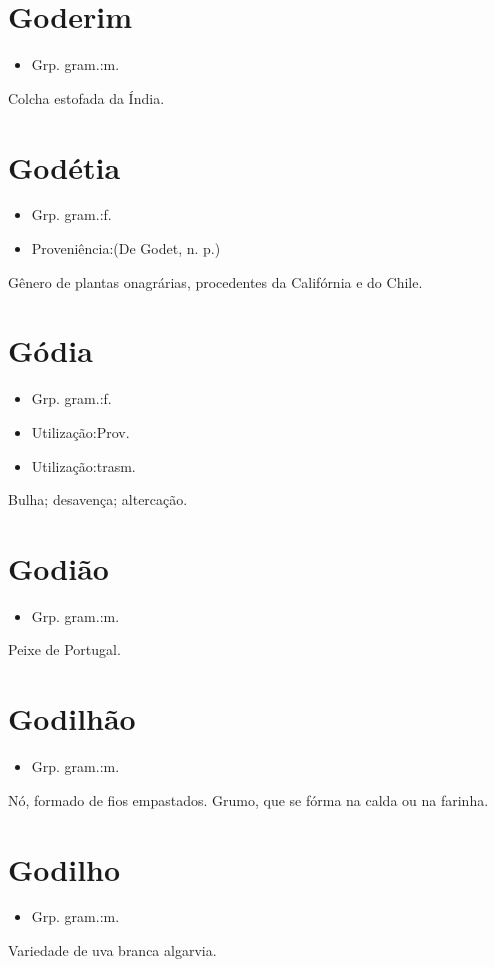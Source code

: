 \section{Goderim}
\begin{itemize}
\item {Grp. gram.:m.}
\end{itemize}
Colcha estofada da Índia.
\section{Godétia}
\begin{itemize}
\item {Grp. gram.:f.}
\end{itemize}
\begin{itemize}
\item {Proveniência:(De \textunderscore Godet\textunderscore , n. p.)}
\end{itemize}
Gênero de plantas onagrárias, procedentes da Califórnia e do Chile.
\section{Gódia}
\begin{itemize}
\item {Grp. gram.:f.}
\end{itemize}
\begin{itemize}
\item {Utilização:Prov.}
\end{itemize}
\begin{itemize}
\item {Utilização:trasm.}
\end{itemize}
Bulha; desavença; altercação.
\section{Godião}
\begin{itemize}
\item {Grp. gram.:m.}
\end{itemize}
Peixe de Portugal.
\section{Godilhão}
\begin{itemize}
\item {Grp. gram.:m.}
\end{itemize}
Nó, formado de fios empastados.
Grumo, que se fórma na calda ou na farinha.
\section{Godilho}
\begin{itemize}
\item {Grp. gram.:m.}
\end{itemize}
Variedade de uva branca algarvia.
